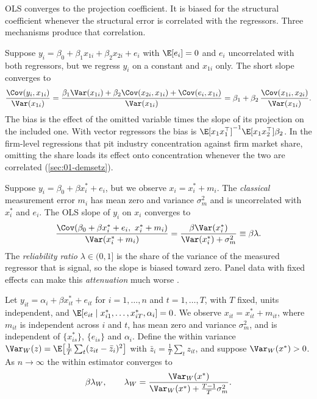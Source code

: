 OLS converges to the projection coefficient. It is biased for the structural coefficient whenever the
structural error is correlated with the regressors. Three mechanisms produce that correlation.

Suppose $y_i = \beta_0 + \beta_1x_{1i} + \beta_2x_{2i} + e_i$ with $\E[e_i] = 0$ and $e_i$ uncorrelated with
both regressors, but we regress $y_i$ on a constant and $x_{1i}$ only. The short slope converges to
\begin{equation}\label{eq:A-ovb}
\frac{\Cov(y_i, x_{1i})}{\Var(x_{1i})}
= \frac{\beta_1\Var(x_{1i}) + \beta_2\Cov(x_{2i}, x_{1i}) + \Cov(e_i, x_{1i})}{\Var(x_{1i})}
= \beta_1 + \beta_2\,\frac{\Cov(x_{1i}, x_{2i})}{\Var(x_{1i})} .
\end{equation}
The bias is the effect of the omitted variable times the slope of its projection on the included one. With
vector regressors the bias is $\E[x_1x_1^\top]^{-1}\E[x_1x_2^\top]\beta_2$. In the firm-level regressions
that pit industry concentration against firm market share, omitting the share loads its effect onto
concentration whenever the two are correlated (\cref{sec:01-demsetz}).

Suppose $y_i = \beta_0 + \beta x_i^* + e_i$, but we observe $x_i = x_i^* + m_i$. The \emph{classical}
measurement error $m_i$ has mean zero and variance $\sigma_m^2$ and is uncorrelated with $x_i^*$ and $e_i$.
The OLS slope of $y_i$ on $x_i$ converges to
\begin{equation}\label{eq:A-attenuation}
\frac{\Cov(\beta_0 + \beta x_i^* + e_i,\ x_i^* + m_i)}{\Var(x_i^* + m_i)}
= \frac{\beta\Var(x_i^*)}{\Var(x_i^*) + \sigma_m^2} \equiv \beta\lambda .
\end{equation}
The \emph{reliability ratio} $\lambda \in (0, 1]$ is the share of the variance of the measured regressor that
is signal, so the slope is biased toward zero. Panel data with fixed effects can make this
\emph{attenuation} much worse \citep{GrilichesHausman1986}.

\begin{proposition}\label{prop:A-fe-attenuation}
Let $y_{it} = \alpha_i + \beta x_{it}^* + e_{it}$ for $i = 1, \dots, n$ and $t = 1, \dots, T$, with $T$ fixed,
units independent, and $\E[e_{it} \mid x_{i1}^*, \dots, x_{iT}^*, \alpha_i] = 0$. We observe
$x_{it} = x_{it}^* + m_{it}$, where $m_{it}$ is independent across $i$ and $t$, has mean zero and variance
$\sigma_m^2$, and is independent of $\{x_{is}^*\}$, $\{e_{is}\}$ and $\alpha_i$. Define the within variance
$\Var_W(z) = \E\bigl[\frac{1}{T}\sum_t(z_{it} - \bar z_i)^2\bigr]$ with $\bar z_i = \frac{1}{T}\sum_t z_{it}$,
and suppose $\Var_W(x^*) > 0$. As $n \to \infty$ the within estimator converges to
\begin{equation}\label{eq:A-fe-attenuation}
\beta\lambda_W, \qquad
\lambda_W = \frac{\Var_W(x^*)}{\Var_W(x^*) + \frac{T - 1}{T}\sigma_m^2} .
\end{equation}
\end{proposition}

